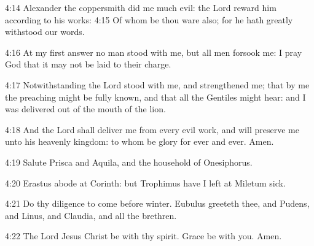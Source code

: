 4:14 Alexander the coppersmith did me much evil: the Lord reward him according to his works: 4:15 Of whom be thou ware also; for he hath greatly withstood our words.

4:16 At my first answer no man stood with me, but all men forsook me: I pray God that it may not be laid to their charge.

4:17 Notwithstanding the Lord stood with me, and strengthened me; that by me the preaching might be fully known, and that all the Gentiles might hear: and I was delivered out of the mouth of the lion.

4:18 And the Lord shall deliver me from every evil work, and will preserve me unto his heavenly kingdom: to whom be glory for ever and ever. Amen.

4:19 Salute Prisca and Aquila, and the household of Onesiphorus.

4:20 Erastus abode at Corinth: but Trophimus have I left at Miletum sick.

4:21 Do thy diligence to come before winter. Eubulus greeteth thee, and Pudens, and Linus, and Claudia, and all the brethren.

4:22 The Lord Jesus Christ be with thy spirit. Grace be with you.  Amen.

